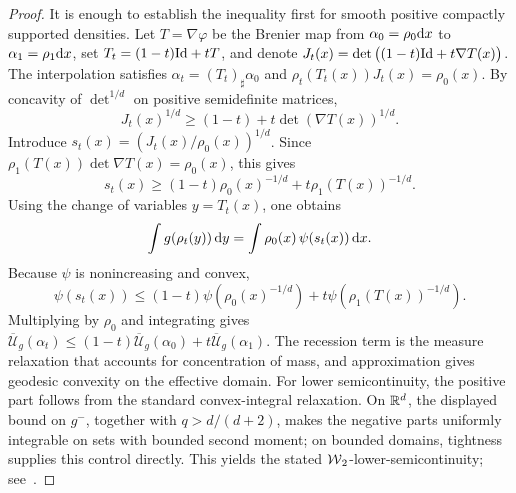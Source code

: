 \begin{proof}
	It is enough to establish the inequality first for smooth positive compactly supported densities. Let \(T=\nabla\varphi\) be the Brenier map from \(\alpha_0=\rho_0\mathrm{d} x\) to \(\alpha_1=\rho_1\mathrm{d} x\), set \(T_t=(1-t)\mathrm{Id}+tT\), and denote
	\(J_t(x)=\det\big((1-t)\mathrm{Id}+t\nabla T(x)\big)\).
	The interpolation satisfies \(\alpha_t=(T_t)_\sharp\alpha_0\) and
	\(\rho_t(T_t(x))J_t(x)=\rho_0(x)\).
	By concavity of \(\det^{1/d}\) on positive semidefinite matrices,
	\[
		J_t(x)^{1/d}\geq (1-t)+t\det(\nabla T(x))^{1/d}.
	\]
	Introduce \(s_t(x)=(J_t(x)/\rho_0(x))^{1/d}\). Since
	\(\rho_1(T(x))\det\nabla T(x)=\rho_0(x)\), this gives
	\[
		s_t(x)\geq (1-t)\rho_0(x)^{-1/d}+t\rho_1(T(x))^{-1/d}.
	\]
	Using the change of variables \(y=T_t(x)\), one obtains
	\[
		\int g(\rho_t(y))\,\mathrm{d} y
		=\int \rho_0(x)\,\psi(s_t(x))\,\mathrm{d} x.
	\]
	Because \(\psi\) is nonincreasing and convex,
	\[
		\psi(s_t(x))
		\leq (1-t)\psi(\rho_0(x)^{-1/d})+t\psi(\rho_1(T(x))^{-1/d}).
	\]
	Multiplying by \(\rho_0\) and integrating gives
	\(\overline{\mathcal U}_g(\alpha_t)\leq(1-t)\overline{\mathcal U}_g(\alpha_0)+t\overline{\mathcal U}_g(\alpha_1)\).
	The recession term is the measure relaxation that accounts for concentration of mass, and approximation gives geodesic convexity on the effective domain. For lower semicontinuity, the positive part follows from the standard convex-integral relaxation. On \(\mathbb{R}^d\), the displayed bound on \(g^-\), together with \(q>d/(d+2)\), makes the negative parts uniformly integrable on sets with bounded second moment; on bounded domains, tightness supplies this control directly. This yields the stated \(\operatorname{\mathcal{W}}_2\)-lower-semicontinuity; see~\cite{mccann1997convexity,ambrosio2006gradient}.
\end{proof}


